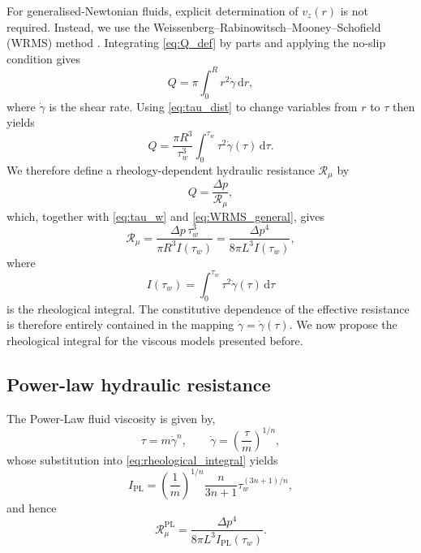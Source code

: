 \documentclass[lineno]{jfm}
\begin{document}
For generalised-Newtonian fluids, explicit determination of $v_z(r)$ is not required. Instead, we use the Weissenberg--Rabinowitsch--Mooney--Schofield (WRMS) method \citep{Rabinowitsch1929,Bird1987}. Integrating \eqref{eq:Q_def} by parts and applying the no-slip condition gives
\begin{equation}
Q=\pi\int_{0}^{R}r^2\dot{\gamma}\,\mathrm{d}r,
\end{equation}
where $\dot{\gamma}$ is the shear rate. Using \eqref{eq:tau_dist} to change variables from $r$ to $\tau$ then yields
\begin{equation}
Q=\frac{\pi R^3}{\tau_w^3}\int_{0}^{\tau_w}\tau^2\dot{\gamma}(\tau)\,\mathrm{d}\tau.
\label{eq:WRMS_general}
\end{equation}
We therefore define a rheology-dependent hydraulic resistance $\mathcal{R}_{\mu}$ by
\begin{equation}
Q=\frac{\Delta p}{\mathcal{R}_{\mu}},
\label{eq:Q_Rmu}
\end{equation}
which, together with \eqref{eq:tau_w} and \eqref{eq:WRMS_general}, gives
\begin{equation}
\mathcal{R}_{\mu}
=
\frac{\Delta p\,\tau_w^3}{\pi R^3 I(\tau_w)}
=
\frac{\Delta p^4}{8\pi L^3 I(\tau_w)},
\label{eq:generalized-hydraulic-resistance}
\end{equation}
where
\begin{equation}
I(\tau_w)=\int_{0}^{\tau_w}\tau^2\dot{\gamma}(\tau)\,\mathrm{d}\tau
\label{eq:rheological_integral}
\end{equation}
is the rheological integral. The constitutive dependence of the effective resistance is therefore entirely contained in the mapping $\dot{\gamma}=\dot{\gamma}(\tau)$. We now propose the rheological integral for the viscous models presented before.

\subsection{Power-law hydraulic resistance}

The Power-Law fluid viscosity is given by,
\begin{equation}
\tau=m\dot{\gamma}^{n},
\qquad
\dot{\gamma}=\left(\frac{\tau}{m}\right)^{1/n},
\label{eq:pl_tau_gamma}
\end{equation}
whose substitution into \eqref{eq:rheological_integral} yields
\begin{equation}
I_{\mathrm{PL}}
=
\left(\frac{1}{m}\right)^{1/n}\frac{n}{3n+1}\tau_w^{(3n+1)/n},
\label{eq:I_PL}
\end{equation}
and hence
\begin{equation}
\mathcal{R}_{\mu}^{\mathrm{PL}}
=
\frac{\Delta p^4}{8\pi L^3 I_{\mathrm{PL}}(\tau_w)}.
\label{eq:R_PL}
\end{equation}
\end{document}
